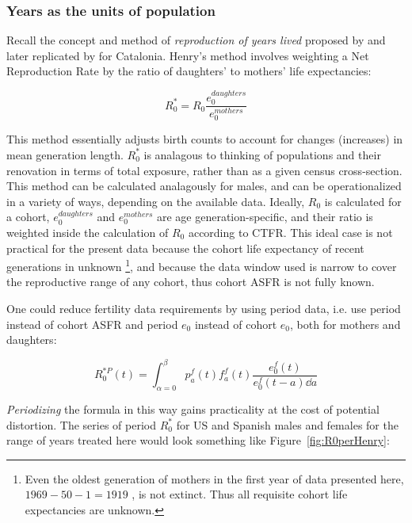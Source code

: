 
\subsubsection{Years as the units of population}
Recall the concept and method of \textit{reproduction of years lived} proposed
by \citet{henry1965reflexions} and later replicated by \citet{cabre1990repro}
for Catalonia. Henry's method involves weighting a Net Reproduction Rate by
the ratio of daughters' to mothers' life expectancies:

\begin{equation}
R_{0}^{\ast} = R_{0} \frac{e_0^{daughters}}{e_0^{mothers}}
\end{equation}

This method essentially adjusts birth counts to account for changes (increases)
in mean generation length. $R_{0}^{\ast}$ is analagous to thinking of populations 
and their renovation in terms of total exposure, rather than as a given census cross-section. This
method can be calculated analagously for males, and can be operationalized 
in a variety of ways, depending on the available data. Ideally, 
$R_{0}$ is calculated for a cohort, $e_0^{daughters}$ and $e_0^{mothers}$ are
age generation-specific, and their ratio is weighted inside the calculation of
$R_0$ according to CTFR. This ideal case is not practical for the present
data because the cohort life expectancy of recent generations in unknown
\footnote{Even the oldest generation of mothers in the first year of data
presented here, $1969-50-1 = 1919$ , is not extinct. Thus all requisite cohort
life expectancies are unknown.}, and because the data window used is narrow to
cover the reproductive range of any cohort, thus cohort ASFR is not fully known.

One could reduce fertility data requirements by using period data, i.e.
use period instead of cohort ASFR and period $e_0$ instead of cohort $e_0$, both
for mothers and daughters:

\begin{equation}
R_{0}^{\ast P}(t) = \int _{\alpha = 0} ^{\beta} p_{a}^{f}(t) f_{a}^{f}(t)
\frac{e_{0}^f(t)}{e_{0}^f(t-a) \dd a}
\end{equation}

\textit{Periodizing} the formula in this way gains practicality at the cost of
potential distortion. The series of period $R_0^\ast$ for US and Spanish males
and females for the range of years treated here would look something like
Figure~\ref{fig:R0perHenry}:

